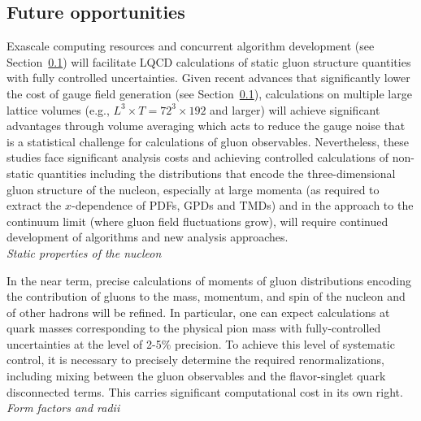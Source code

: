 \subsection{Future opportunities}

Exascale computing resources and concurrent algorithm development {\color{red} (see Section~\ref{})} will facilitate LQCD calculations of static gluon structure quantities with fully controlled uncertainties. Given recent advances that significantly lower the cost of gauge field generation {\color{red} (see Section~\ref{})}, calculations on multiple large lattice volumes (e.g., $L^3\times T=72^3 \times 192$ and larger) will achieve significant advantages through volume averaging which acts to reduce the gauge noise that is a statistical challenge for calculations of gluon observables. Nevertheless, these studies face significant analysis costs and achieving controlled calculations of non-static quantities including the distributions that encode the three-dimensional gluon structure of the nucleon, especially at large momenta (as required to extract the $x$-dependence of PDFs, GPDs and TMDs) and in the approach to the continuum limit (where gluon field fluctuations grow), will require continued development of algorithms and new analysis approaches.\\


{\it Static properties of the nucleon}

In the near term, precise calculations of moments of gluon distributions encoding the contribution of gluons to the mass, momentum, and spin of the nucleon and of other hadrons will be refined. In particular, one can expect calculations at quark masses corresponding to the physical pion mass with fully-controlled uncertainties at the level of 2-5\% precision. 
To achieve this level of systematic control, it is necessary to precisely determine the required renormalizations, including mixing between the gluon observables and the flavor-singlet quark disconnected terms. This carries significant computational cost in its own right.\\
 

{\it Form factors and radii}

